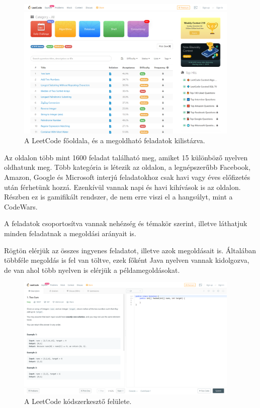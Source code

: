 \begin{figure}[h]
    \centering
    \includegraphics[width=0.95\textwidth]{images/leetcode_problems.png}
    \caption{A LeetCode főoldala, és a megoldható feladatok kilistázva.}
    \label{fig:leetcode_problems}
\end{figure}

Az oldalon több mint 1600 feladat található meg, amiket 15 különböző nyelven oldhatunk meg. Több kategória is létezik az oldalon, a legnépszerűbb Facebook, Amazon, Google és Microsoft interjú feladatokhoz csak havi vagy éves előfizetés után férhetünk hozzá. Ezenkívül vannak napi és havi kihívások is az oldalon. Részben ez is gamifikált rendszer, de nem erre viszi el a hangsúlyt, mint a CodeWars.

A feladatok csoportosítva vannak nehézség és témakör szerint, illetve láthatjuk minden feladatnak a megoldási arányait is.

Rögtön elérjük az összes ingyenes feladatot, illetve azok megoldásait is. Általában többféle megoldás is fel van töltve, ezek főként Java nyelven vannak kidolgozva, de van ahol több nyelven is elérjük a példamegoldásokat.

\begin{figure}[h]
    \centering
    \includegraphics[width=0.95\textwidth]{images/leetcode_editor.png}
    \caption{A LeetCode kódszerkesztő felülete.}
    \label{fig:leetcode_editor}
\end{figure}

